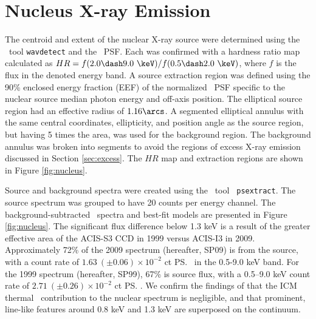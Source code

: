 \documentclass[useAMS,usenatbib]{mn2e}
\begin{document}
\section{Nucleus X-ray Emission}
\label{sec:centsrc}

The centroid and extent of the nuclear X-ray source were determined
using the \ciao\ tool {\tt wavdetect} and the \cxo\ PSF. Each was
confirmed with a hardness ratio map calculated as $HR = f(2.0 \dash
9.0 ~\keV) / f(0.5 \dash 2.0 ~\keV)$, where $f$ is the flux in the
denoted energy band. A source extraction region was defined using the
90\% enclosed energy fraction (EEF) of the normalized \cxo\ PSF
specific to the nuclear source median photon energy and off-axis
position. The elliptical source region had an effective radius of
$1.16\arcs$. A segmented elliptical annulus with the same central
coordinates, ellipticity, and position angle as the source region, but
having 5 times the area, was used for the background region. The
background annulus was broken into segments to avoid the regions of
excess X-ray emission discussed in Section \ref{sec:excess}. The $HR$
map and extraction regions are shown in Figure \ref{fig:nucleus}.

Source and background spectra were created using the \ciao\ tool {\tt
  psextract}. The source spectrum was grouped to have 20 counts per
energy channel. The background-subtracted \cxo\ spectra and best-fit
models are presented in Figure \ref{fig:nucleus}. The significant flux
difference below 1.3 keV is a result of the greater effective area of
the ACIS-S3 CCD in 1999 versus ACIS-I3 in 2009. Approximately 72\% of
the 2009 spectrum (hereafter, SP09) is from the source, with a count
rate of $1.63 ~(\pm 0.06) \times 10^{-2}$ ct \ps\ in the 0.5-9.0 keV
band. For the 1999 spectrum (hereafter, SP99), 67\% is source flux,
with a 0.5--9.0 keV count rate of $2.71 ~(\pm 0.26) \times 10^{-2}$ ct
\ps. We confirm the findings of \citet{2001MNRAS.321L..15I} that the
ICM thermal \feka\ contribution to the nuclear spectrum is negligible,
and that prominent, line-like features around 0.8 keV and 1.3 keV are
superposed on the continuum.
\end{document}
